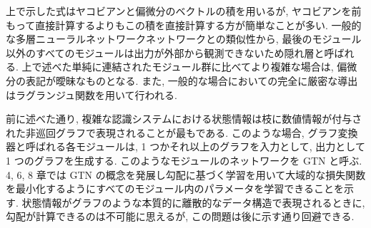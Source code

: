 \documentclass[twocolumn]{jarticle}     %
\begin{document}
上で示した式はヤコビアンと偏微分のベクトルの積を用いるが, ヤコビアンを前もって直接計算するよりもこの積を直接計算する方が簡単なことが多い. 一般的な多層ニューラルネットワークネットワークとの類似性から, 最後のモジュール以外のすべてのモジュールは出力が外部から観測できないため隠れ層と呼ばれる. 上で述べた単純に連結されたモジュール群に比べてより複雑な場合は, 偏微分の表記が曖昧なものとなる. また, 一般的な場合においての完全に厳密な導出はラグランジュ関数を用いて行われる.
\par
前に述べた通り, 複雑な認識システムにおける状態情報は枝に数値情報が付与された非巡回グラフで表現されることが最もである. このような場合, グラフ変換器と呼ばれる各モジュールは, 1 つかそれ以上のグラフを入力として, 出力として　1 つのグラフを生成する. このようなモジュールのネットワークを GTN と呼ぶ. 4, 6, 8 章では GTN の概念を発展し勾配に基づく学習を用いて大域的な損失関数を最小化するようにすべてのモジュール内のパラメータを学習できることを示す. 状態情報がグラフのような本質的に離散的なデータ構造で表現されるときに, 勾配が計算できるのは不可能に思えるが, この問題は後に示す通り回避できる.
\end{document}
